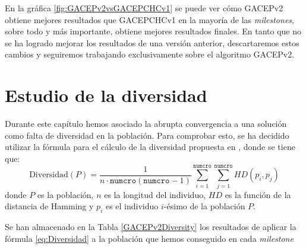 En la gráfica \ref{fig:GACEPv2vsGACEPCHCv1} se puede ver cómo GACEPv2 obtiene mejores resultados que GACEPCHCv1 en la mayoría de las \textit{milestones}, sobre todo y más importante, obtiene mejores resultados finales. 
En tanto que no se ha logrado mejorar los resultados de una versión anterior, descartaremos estos cambios y seguiremos trabajando exclusivamente sobre el algoritmo GACEPv2.



\section{Estudio de la diversidad}

Durante este capítulo hemos asociado la abrupta convergencia a una solución como falta de diversidad en la población. 
Para comprobar esto, se ha decidido utilizar la fórmula para el cálculo de la diversidad propuesta en \parencite{oppacherShiftingBalanceGenetic}, donde se tiene que:
\begin{equation}
\text{Diversidad}(P) = \dfrac{1}{n\cdot \texttt{numcro}(\texttt{numcro}-1)}\sum_{i=1}^{\texttt{numcro}}\sum_{j=1}^{\texttt{numcro}} HD(p_i,p_j)
\label{eq:Diversidad}
\end{equation}
donde $P$ es la población, $n$ es la longitud del individuo, $HD$ es la función de la distancia de Hamming y $p_i$ es el individuo $i$-ésimo de la población $P$.

Se han almacenado en la Tabla \ref{GACEPv2Diversity} los resultados de aplicar la fórmula \ref{eq:Diversidad} a la población que hemos conseguido en cada \textit{milestone}

